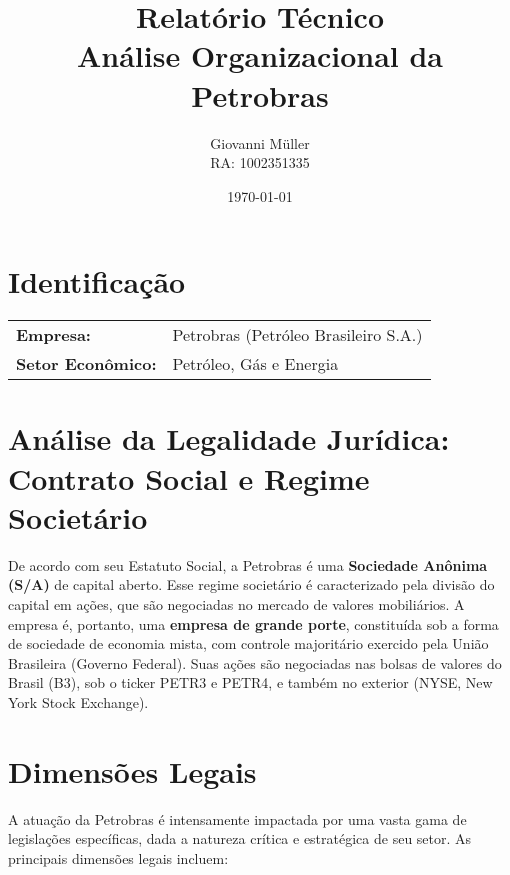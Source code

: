 \documentclass[12pt, a4paper]{article}
\title{Relatório Técnico \\ Análise Organizacional da Petrobras}
\author{Giovanni Müller \\ RA: 1002351335}
\date{\today}
\begin{document}
\maketitle

\section*{Identificação}
\begin{tabular}{ll}
\textbf{Empresa:} & Petrobras (Petróleo Brasileiro S.A.) \\
\textbf{Setor Econômico:} & Petróleo, Gás e Energia \\
\end{tabular}

\section{Análise da Legalidade Jurídica: Contrato Social e Regime Societário}

De acordo com seu Estatuto Social, a Petrobras é uma \textbf{Sociedade Anônima (S/A)} de capital aberto. Esse regime societário é caracterizado pela divisão do capital em ações, que são negociadas no mercado de valores mobiliários. A empresa é, portanto, uma \textbf{empresa de grande porte}, constituída sob a forma de sociedade de economia mista, com controle majoritário exercido pela União Brasileira (Governo Federal). Suas ações são negociadas nas bolsas de valores do Brasil (B3), sob o ticker PETR3 e PETR4, e também no exterior (NYSE, New York Stock Exchange).

\section{Dimensões Legais}

A atuação da Petrobras é intensamente impactada por uma vasta gama de legislações específicas, dada a natureza crítica e estratégica de seu setor. As principais dimensões legais incluem:
\end{document}
